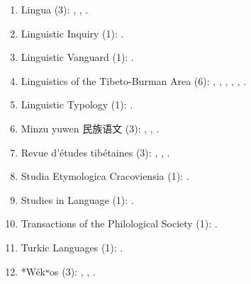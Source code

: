 \documentclass[oneside,a4paper,11pt]{article}
\newcommand{\zh}[1]{{\cn #1}}
\begin{document}
\begin{enumerate}
 \item Lingua (3):  \cite{jacques11lingua}, \cite{jacques12incorp}, \cite{jacques14antipassive}.
 \item Linguistic Inquiry (1): \cite{antonov14need}.
 \item Linguistic Vanguard (1): \cite{jacques16th}.
 \item Linguistics of the Tibeto-Burman Area (6): \cite{jacques09wazur}, \cite{jacques13tropative}, \cite{jacques14linking}, \cite{jacques15spontaneous}, \cite{jacques16si}, \cite{jacques16complementation}.
 \item Linguistic Typology (1): \cite{jacques13harmonization}.
 \item Minzu yuwen \zh{民族语文} (3): \cite{jacques03s.houzhui}, \cite{jacques04redupl}, \cite{jacques08weiyu}.
 \item Revue d'études tibétaines (3): \cite{jacques07naksatram},  \cite{jacques08debther},   \cite{jacques10ndr}.
 \item Studia Etymologica Cracoviensia (1):  \cite{jacques13vama}.
  \item Studies in Language (1): \cite{jacques14auditory}.
  \item Transactions of the Philological Society (1):  \cite{jacques12internal}.
  \item Turkic Languages (1): \cite{antonov12kumush}.
\item *Wékʷos (3): \cite{jacques14honey}, \cite{jacques16camara}, \cite{jacques17hrd}.
 \end{enumerate} 
 
\end{document}
